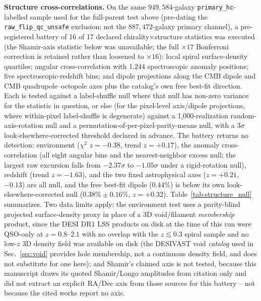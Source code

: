\documentclass[twocolumn,linenumbers]{aastex702}
\begin{document}
\textbf{Structure cross-correlations.} On the same $949{,}584$-galaxy
\texttt{primary\_hc}-labelled sample used for the full-parent test above
(pre-dating the \texttt{raw\_flip\_qc\_unsafe} exclusion; not the
$887{,}472$-galaxy primary channel), a pre-registered battery of 16 of 17
declared chirality$\times$structure statistics was executed (the
Shamir-axis statistic below was unavailable; the full $\times17$
Bonferroni correction is retained rather than loosened to $\times16$):
local spiral surface-density quartiles; angular cross-correlation with
1,244 spectroscopic anomaly positions; five spectroscopic-redshift bins;
and dipole projections along the CMB dipole and CMB quadrupole--octopole
axes plus the catalog's own free best-fit direction. Each is tested
against a label-shuffle null where that null has non-zero variance for the
statistic in question, or else (for the pixel-level axis/dipole
projections, where within-pixel label-shuffle is degenerate) against a
1,000-realization random-axis-rotation null and a permutation-of-per-pixel-parity-means
null, with a $3\sigma$ look-elsewhere-corrected threshold declared in
advance. The battery returns no detection: environment ($\chi^2$
$z=-0.38$, trend $z=+0.17$), the anomaly cross-correlation (all eight
angular bins and the nearest-neighbor excess null; the largest raw
excursion falls from $-2.37\sigma$ to $-1.05\sigma$ under a rigid-rotation
null), redshift (trend $z=-1.63$), and the two fixed astrophysical axes
($z=+0.21$, $-0.13$) are all null, and the free best-fit dipole ($0.44\%$)
is below its own look-elsewhere-corrected null ($0.38\%\pm0.16\%$,
$z=+0.32$). Table~\ref{tab:structure_null} summarizes. Two data limits
apply: the environment test uses a parity-blind projected surface-density
proxy in place of a 3D void/filament \emph{membership} product, since the
DESI DR1 LSS products on disk at the time of this run were QSO-only at
$z=0.8$--$2.1$ with no overlap with the $z\lesssim0.3$ spiral sample and no
low-$z$ 3D density field was available on disk (the DESIVAST void
\emph{catalog} used in Sec.~\ref{sec:void} provides hole membership,
not a continuous density field, and does not substitute for one here); and
Shamir's claimed axis is not tested, because this manuscript draws its
quoted Shamir/Longo amplitudes from citation only and did not extract an
explicit RA/Dec axis from those sources for this battery -- not because
the cited works report no axis.
\end{document}
